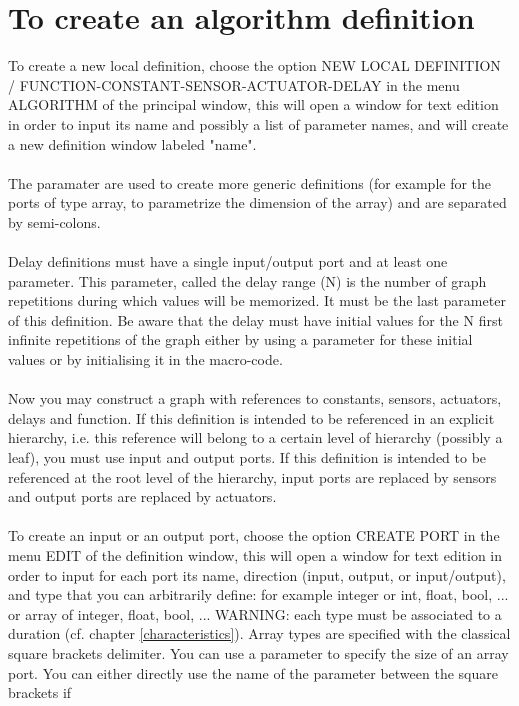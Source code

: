 \documentclass[11pt,twoside]{report}
\begin{document}
\section{To create an algorithm definition}
To create a new local definition, choose the option NEW LOCAL
DEFINITION / FUNCTION-CONSTANT-SENSOR-ACTUATOR-DELAY in the menu
ALGORITHM of the principal window, this will open a window for text
edition in order to input its name and possibly a list of parameter
names, and will create a new
definition window labeled "name".\\\\
The paramater are used to create more generic definitions (for example
for the ports of type array, to parametrize the dimension of the
array) and are separated by semi-colons.\\\\
Delay definitions must have a single input/output port and at least
one parameter. This parameter, called the delay range (N) is the number of
graph repetitions during which values will be memorized. It must be
the last parameter of this definition. Be aware
that the delay must have initial values for the N first infinite
repetitions of the graph either by using a parameter for these initial
values or by initialising it in the macro-code.\\\\
Now you may construct a graph with references to constants, sensors,
actuators, delays and function. If this definition is intended to be
referenced in an explicit hierarchy, i.e. this reference will belong
to a certain level of hierarchy (possibly a leaf), you must use input
and output ports. If this definition is intended to be referenced at
the root level of the hierarchy, input ports are replaced by sensors
and output
ports are replaced by actuators.\\\\
To create an input or an output port, choose the option CREATE PORT in
the menu EDIT of the definition window, this will open a window for
text edition in order to input for each port its name, direction
(input, output, or input/output), and type that you can arbitrarily
define: for example integer or int, float, bool, ... or array of
integer, float, bool, ... WARNING: each type must be associated to a
duration (cf. chapter \ref {characteristics}). Array types are
specified with the classical square brackets delimiter. You can use a
parameter to specify the size of an array port. You can either
directly use the name of the parameter between the square brackets if
\end{document}
